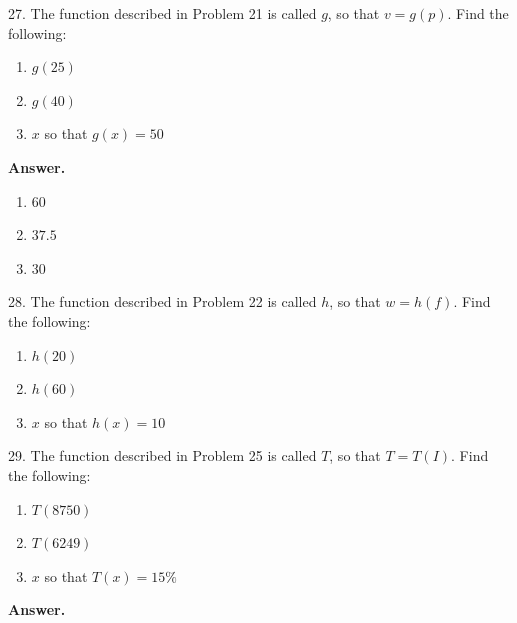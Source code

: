 \documentclass[10pt,]{book}
\theoremstyle{plain}
\theoremstyle{definition}
\theoremstyle{definition}
\theoremstyle{definition}
\theoremstyle{definition}
\numberwithin{equation}{part}
\begin{document}
\begin{exerciselist}
\item[27.]\hypertarget{exercise-96}{}The function described in Problem 21 is called \(g\), so that \(v = g( p)\). Find the following: \leavevmode%
\begin{enumerate}[label=\alph*]
\item\hypertarget{li-340}{}\(g(25)\)%
\item\hypertarget{li-341}{}\(g(40)\)%
\item\hypertarget{li-342}{}\(x\) so that \(g(x) = 50\)%
\end{enumerate}
%
\par\smallskip
\par\smallskip
\noindent\textbf{Answer.}\hypertarget{answer-57}{}\quad
\leavevmode%
\begin{enumerate}[label=\alph*]
\item\hypertarget{li-343}{}\(60\)%
\item\hypertarget{li-344}{}\(37.5\)%
\item\hypertarget{li-345}{}\(30\)%
\end{enumerate}
%
\item[28.]\hypertarget{exercise-97}{}The function described in Problem 22 is called \(h\), so that \(w = h( f)\). Find the following: \leavevmode%
\begin{enumerate}[label=\alph*]
\item\hypertarget{li-346}{}\(h(20)\)%
\item\hypertarget{li-347}{}\(h(60)\)%
\item\hypertarget{li-348}{}\(x\) so that \(h(x) = 10\)%
\end{enumerate}
%
\par\smallskip
\item[29.]\hypertarget{exercise-98}{}The function described in Problem 25 is called \(T\), so that \(T = T( I)\). Find the following: \leavevmode%
\begin{enumerate}[label=\alph*]
\item\hypertarget{li-349}{}\(T(8750)\)%
\item\hypertarget{li-350}{}\(T(6249)\)%
\item\hypertarget{li-351}{}\(x\) so that \(T(x) = 15\%\)%
\end{enumerate}
%
\par\smallskip
\par\smallskip
\noindent\textbf{Answer.}\hypertarget{answer-58}{}\quad
\leavevmode%
\begin{enumerate}[label=\alph*]

\end{enumerate}
\end{exerciselist}
\end{document}
